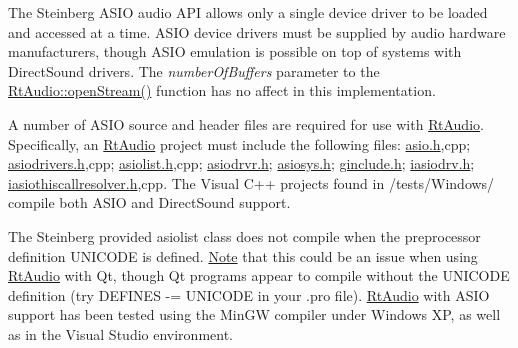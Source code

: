 The Steinberg A\+S\+IO audio A\+PI allows only a single device driver to be loaded and accessed at a time. A\+S\+IO device drivers must be supplied by audio hardware manufacturers, though A\+S\+IO emulation is possible on top of systems with Direct\+Sound drivers. The {\itshape number\+Of\+Buffers} parameter to the \hyperlink{class_rt_audio_a6907539d2527775df778ebce32ef1e3b}{Rt\+Audio\+::open\+Stream()} function has no affect in this implementation.

A number of A\+S\+IO source and header files are required for use with \hyperlink{class_rt_audio}{Rt\+Audio}. Specifically, an \hyperlink{class_rt_audio}{Rt\+Audio} project must include the following files\+: {\ttfamily \hyperlink{asio_8h_source}{asio.\+h},cpp; \hyperlink{asiodrivers_8h_source}{asiodrivers.\+h},cpp; \hyperlink{asiolist_8h_source}{asiolist.\+h},cpp; \hyperlink{asiodrvr_8h_source}{asiodrvr.\+h}; \hyperlink{asiosys_8h_source}{asiosys.\+h}; \hyperlink{ginclude_8h_source}{ginclude.\+h}; \hyperlink{iasiodrv_8h_source}{iasiodrv.\+h}; \hyperlink{iasiothiscallresolver_8h_source}{iasiothiscallresolver.\+h},cpp}. The Visual C++ projects found in {\ttfamily /tests/\+Windows/} compile both A\+S\+IO and Direct\+Sound support.

The Steinberg provided {\ttfamily asiolist} class does not compile when the preprocessor definition U\+N\+I\+C\+O\+DE is defined. \hyperlink{class_note}{Note} that this could be an issue when using \hyperlink{class_rt_audio}{Rt\+Audio} with Qt, though Qt programs appear to compile without the U\+N\+I\+C\+O\+DE definition (try {\ttfamily D\+E\+F\+I\+N\+ES -\/= U\+N\+I\+C\+O\+DE} in your .pro file). \hyperlink{class_rt_audio}{Rt\+Audio} with A\+S\+IO support has been tested using the Min\+GW compiler under Windows XP, as well as in the Visual Studio environment. 